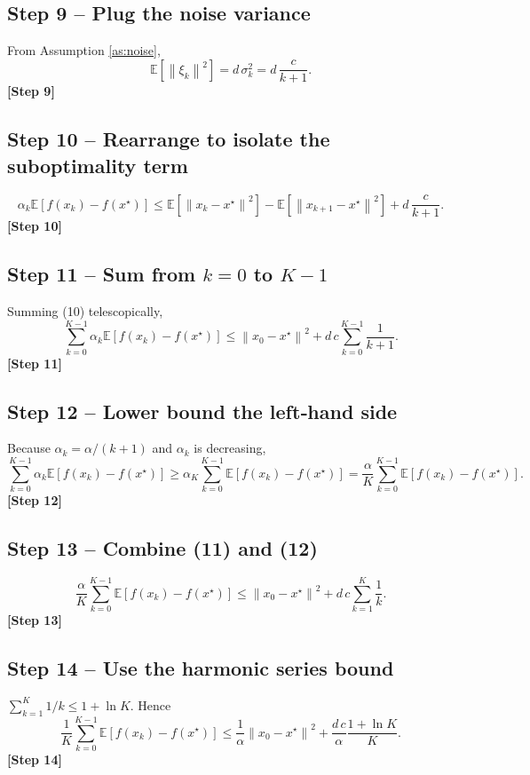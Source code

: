 \documentclass{article}
\newcommand{\E}{\mathbb{E}}
\newcommand{\norm}[1]{\left\lVert #1\right\rVert}
\begin{document}
\subsection*{Step 9 – Plug the noise variance}
From Assumption \ref{as:noise},
\[
\E\!\left[\norm{\xi_k}^{2}\right]=d\,\sigma_k^{2}=d\,\frac{c}{k+1}.
\tag{9}
\]
\textbf{[Step 9]}

\subsection*{Step 10 – Rearrange to isolate the suboptimality term}
\[
\alpha_k\E\!\left[f(x_k)-f(x^\star)\right]
\le \E\!\left[\norm{x_k-x^\star}^{2}\right]
-\E\!\left[\norm{x_{k+1}-x^\star}^{2}\right]
+d\,\frac{c}{k+1}.
\tag{10}
\]
\textbf{[Step 10]}

\subsection*{Step 11 – Sum from $k=0$ to $K-1$}
Summing (10) telescopically,
\[
\sum_{k=0}^{K-1}\alpha_k\E\!\left[f(x_k)-f(x^\star)\right]
\le \norm{x_0-x^\star}^{2}
+ d\,c\sum_{k=0}^{K-1}\frac{1}{k+1}.
\tag{11}
\]
\textbf{[Step 11]}

\subsection*{Step 12 – Lower bound the left‑hand side}
Because $\alpha_k=\alpha/(k+1)$ and $\alpha_k$ is decreasing,
\[
\sum_{k=0}^{K-1}\alpha_k\E\!\left[f(x_k)-f(x^\star)\right]
\ge \alpha_K \sum_{k=0}^{K-1}\E\!\left[f(x_k)-f(x^\star)\right]
= \frac{\alpha}{K}\sum_{k=0}^{K-1}\E\!\left[f(x_k)-f(x^\star)\right].
\tag{12}
\]
\textbf{[Step 12]}

\subsection*{Step 13 – Combine (11) and (12)}
\[
\frac{\alpha}{K}\sum_{k=0}^{K-1}\E\!\left[f(x_k)-f(x^\star)\right]
\le \norm{x_0-x^\star}^{2}+d\,c\sum_{k=1}^{K}\frac{1}{k}.
\tag{13}
\]
\textbf{[Step 13]}

\subsection*{Step 14 – Use the harmonic series bound}
$\sum_{k=1}^{K}1/k\le 1+\ln K$. Hence
\[
\frac{1}{K}\sum_{k=0}^{K-1}\E\!\left[f(x_k)-f(x^\star)\right]
\le \frac{1}{\alpha}\norm{x_0-x^\star}^{2}
+\frac{d\,c}{\alpha}\frac{1+\ln K}{K}.
\tag{14}
\]
\textbf{[Step 14]}
\end{document}
